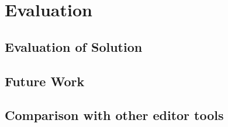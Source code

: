 
\chapter{Evaluation} %

\label{Chapter7} %



\section{Evaluation of Solution}

\section{Future Work}


\section{Comparison with other editor tools}
